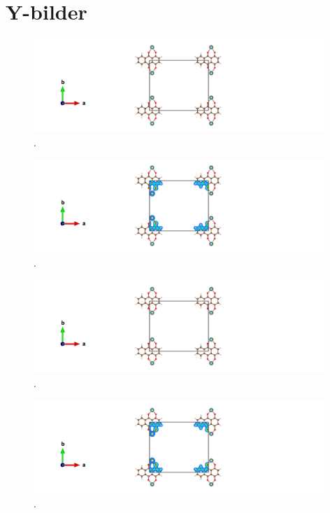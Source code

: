 \documentclass{article}
\begin{document}
\vspace{1cm}

\section{Y-bilder}

  \begin{figure}[H]
      \centering
      \includegraphics[width = 11cm]{../fig/Y_staticbefore_CONTCAR.png}
      \caption{. }
      \label{fig:Y_staticbefore_CONTCAR}
  \end{figure}

  \begin{figure}[H]
      \centering
      \includegraphics[width = 11cm]{../fig/Y_staticbefore_CHGCAR.png}
      \caption{. }
      \label{fig:Y_staticbefore_CHGCAR}
  \end{figure}

  \begin{figure}[H]
      \centering
      \includegraphics[width = 11cm]{../fig/Y_relax_CONTCAR.png}
      \caption{. }
      \label{fig:Y_relax_CONTCAR}
  \end{figure}

  \begin{figure}[H]
      \centering
      \includegraphics[width = 11cm]{../fig/Y_relax_CHGCAR.png}
      \caption{. }
      \label{fig:Y_relax_CHGCAR}
  \end{figure}
\end{document}
